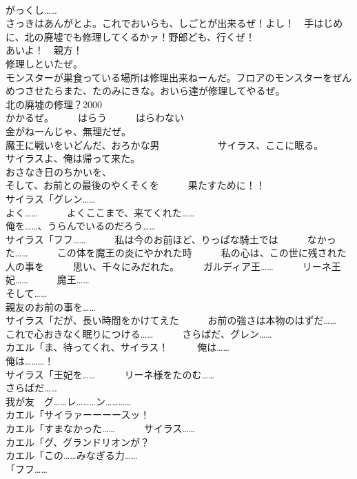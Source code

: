 \documentclass[8pt]{extreport}
\begin{document}
\begin{CJK}{UTF8}{min}
\\	がっくし……	
\\	さっきはあんがとよ。これでおいらも、しごとが出来るぜ！よし！　手はじめに、北の廃墟でも修理してくるかァ！野郎ども、行くぜ！	
\\	あいよ！　親方！	
\\	修理しといたぜ。	
\\	モンスターが巣食っている場所は修理出来ねーんだ。フロアのモンスターをぜんめつさせたらまた、たのみにきな。おいら達が修理してやるぜ。	
\\	北の廃墟の修理？2000
\\	かかるぜ。　　　はらう　　　はらわない	
\\	金がねーんじゃ、無理だぜ。	
\\	魔王に戦いをいどんだ、おろかな男　　　　　　サイラス、ここに眠る。	
\\	サイラスよ、俺は帰って来た。	
\\	おさなき日のちかいを、	
\\	そして、お前との最後のやくそくを　　　果たすために！！	
\\	サイラス「グレン……	
\\	よく……　　　よくここまで、来てくれた……	
\\	俺を……、うらんでいるのだろう……	
\\	サイラス「フフ……　　　私は今のお前ほど、りっぱな騎土では　　　なかった……　　　この体を魔王の炎にやかれた時　　　私の心は、この世に残された人の事を　　　思い、千々にみだれた。　　　ガルディア王……　　　リーネ王妃……　　　魔王……	
\\	そして……	
\\	親友のお前の事を……	
\\	サイラス「だが、長い時間をかけてえた　　　お前の強さは本物のはずだ……	
\\	これで心おきなく眠りにつける……　　　さらばだ、グレン……	
\\	カエル「ま、待ってくれ、サイラス！　　　俺は……	
\\	俺は………！	
\\	サイラス「王妃を……　　　リーネ様をたのむ……	
\\	さらばだ……	
\\	我が友　グ……レ………ン…………	
\\	カエル「サイラァーーーースッ！	
\\	カエル「すまなかった……　　　サイラス……	
\\	カエル「グ、グランドリオンが？	
\\	カエル「この……みなぎる力…… 
\\	「フフ……	

\end{CJK}
\end{document}
